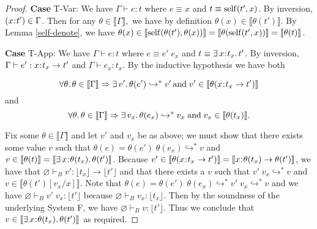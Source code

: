 \documentclass[11pt]{article}
\newcommand{\bind}{\hspace{0.05em}{:}\hspace{0.05em}} %
\newcommand{\lb}{\llbracket}         %
\newcommand{\rb}{\rrbracket}         %
\newcommand{\many}{\hookrightarrow^*}
\newcommand{\existype}[3]{\exists\, #1\bind #2.\, #3}
\newcommand{\functype}[3]{#1\bind #2 \rightarrow #3}
\begin{document}
\begin{proof}
{\bf Case} {\sc T-Var}: We have $\Gamma \vdash e : t$ where $e \equiv x$ and $t \equiv {\rm self}(t', x)$. By inversion, $(x\bind t') \in \Gamma$. Then for any $\theta \in \lb\Gamma\rb,$ we have by definition $\theta(x) \in \lb \theta(t')\rb$. 
By Lemma \ref{self-denote}, we have $\theta(x) \in \lb {\rm self}(\theta(t'), \theta(x))\rb = \lb\theta({\rm self}(t',x))\rb = \lb\theta(t)\rb$.

{\bf Case} {\sc T-App}: We have $\Gamma \vdash e : t$ where $e \equiv e'\; e_x$ and $t \equiv \existype{x}{t_x}{t'}$. By inversion,
$\Gamma \vdash e' : \functype{x}{t_x}{t'}$ and $\Gamma \vdash e_x : t_x$. 
By the inductive hypothesis we have both
                                                                                                                                                                                                                                                                                                                                            
\begin{equation}\label{3.8.1}
\forall \theta.\, \theta\in\lb\Gamma\rb \Rightarrow \exists\, v'.\,
\theta(e') \many v' \,{\rm and}\; v' \in \lb\theta(\functype{x}{t_x}{t'})\rb\end{equation}
and
\begin{equation}\label{3.8.2}
\forall \theta.\, \theta \in \lb\Gamma\rb \Rightarrow \exists\, v_x.\,
\theta(e_x) \many v_x \;{\rm and}\; v_x \in \lb\theta(t_x)\rb.
\end{equation}

Fix some $\theta \in \lb\Gamma \rb$ and let $v'$ and $v_x$ be as above; we must show that there exists some value $v$ such that $\theta(e) = \theta(e')\; \theta(e_x) \many v$ and $v \in \lb\theta(t)\rb = \lb\existype{x}{\theta(t_x)}{\theta(t')}\rb$. 
Because $v' \in \lb\theta(\functype{x}{t_x}{t'})\rb =\lb\functype{x}{\theta(t_x)}{\theta(t')}\rb$, we have that $\varnothing \vdash_B v' : \lfloor t_x\rfloor \rightarrow \lfloor t'\rfloor$ and that there exists a $v$ such that $v'\; v_x \many v$ and $v \in \lb \theta(t')[v_x/x]\rb$. Note that $\theta(e) = \theta(e')\; \theta(e_x) \many v'\; v_x \many v$ and we have $\varnothing \vdash_B v'\; v_x : \lfloor t' \rfloor$ because $\varnothing \vdash_B v_x:\lfloor t_x\rfloor$. Then by the soundness of the underlying System F, we have $\varnothing \vdash_B v : \lfloor t' \rfloor$. Thus we conclude that $v \in \lb \existype{x}{\theta(t_x)}{\theta(t')}\rb$ as required.


\end{proof}
\end{document}
